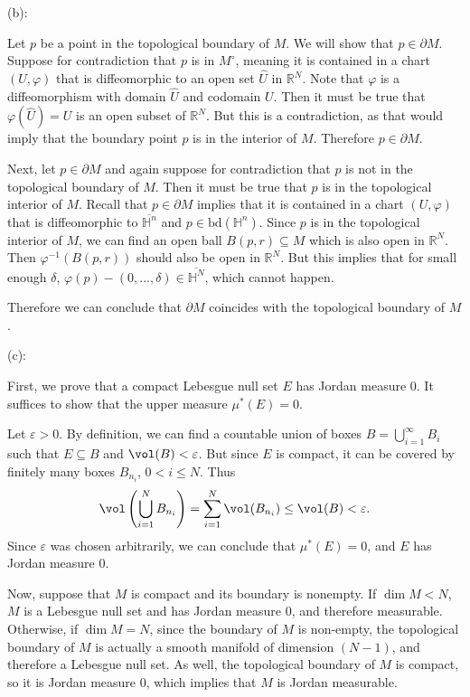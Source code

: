 \documentclass{../../../tex-setup/eh-homework}
\begin{document}
\begin{question}{42}
        (b):

        Let \(p\) be a point in the topological boundary of \(M\). We will show that \(p \in \partial M\). Suppose for contradiction that \(p\) is in \(M^\circ\), meaning it is contained in a chart \((U, \varphi)\) that is diffeomorphic to an open set \(\hat{U}\) in \(\mathbb{R}^N\). Note that \(\varphi\) is a diffeomorphism with domain \(\hat{U}\) and codomain \(U\). Then it must be true that \(\varphi (\hat{U}) = U\) is an open subset of \(\mathbb{R}^N\). But this is a contradiction, as that would imply that the boundary point \(p\) is in the interior of \(M\). Therefore \(p \in \partial M\).

        Next, let \(p \in \partial M\) and again suppose for contradiction that \(p\) is not in the topological boundary of \(M\). Then it must be true that \(p\) is in the topological interior of \(M\). Recall that \(p \in \partial M\) implies that it is contained in a chart \((U, \varphi)\) that is diffeomorphic to \(\overline{\mathbb{H}^n}\) and \(p \in \mathrm{bd} (\mathbb{H}^n)\). Since \(p\) is in the topological interior of \(M\), we can find an open ball \(B(p, r) \subseteq M\) which is also open in \(\mathbb{R}^N\). Then \(\varphi ^{-1}(B(p,r))\) should also be open in \(\mathbb{R}^N\). But this implies that for small enough \(\delta\), \(\varphi (p) - (0, ..., \delta) \in \overline{\mathbb{H}^N}\), which cannot happen.

        \smallskip

        Therefore we can conclude that \(\partial M\) coincides with the topological boundary of \(M\).

        \medskip

        (c):

        First, we prove that a compact Lebesgue null set \(E\) has Jordan measure 0. It suffices to show that the upper measure \(\mu ^* (E) = 0\).

        Let \(\varepsilon > 0\). By definition, we can find a countable union of boxes \(B = \bigcup_{i=1}^{\infty} B_i\) such that \(E \subseteq B\) and \(\vol(B) < \varepsilon\). But since \(E\) is compact, it can be covered by finitely many boxes \(B_{n_i}\), \(0 < i \leq N\). Thus
        \[
            \vol\left( \bigcup_{i=1}^{N} B_{n_i} \right) = \sum_{i=1}^{N} \vol(B_{n_i}) \leq \vol(B) < \varepsilon.
        \]
        Since \(\varepsilon\) was chosen arbitrarily, we can conclude that \(\mu ^* (E) = 0\), and \(E\) has Jordan measure 0.

        Now, suppose that \(M\) is compact and its boundary is nonempty. If \(\dim M < N\), \(M\) is a Lebesgue null set and has Jordan measure 0, and therefore measurable. Otherwise, if \(\dim M = N\), since the boundary of \(M\) is non-empty, the topological boundary of \(M\) is actually a smooth manifold of dimension \((N-1)\), and therefore a Lebesgue null set. As well, the topological boundary of \(M\) is compact, so it is Jordan measure 0, which implies that \(M\) is Jordan measurable.
    \end{question}
\end{document}
